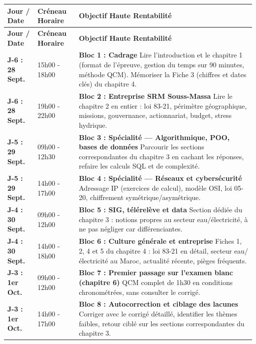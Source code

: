 {\small
\begin{longtable}{|p{3cm}|p{3.5cm}|p{8.5cm}|}
\hline
\rowcolor{gray!20} \textbf{Jour / Date} & \textbf{Créneau Horaire} & \textbf{Objectif Haute Rentabilité} \\ \hline
\endfirsthead
\hline
\rowcolor{gray!20} \textbf{Jour / Date} & \textbf{Créneau Horaire} & \textbf{Objectif Haute Rentabilité} \\ \hline
\endhead

\textbf{J-6 : 28 Sept.} & 15h00 - 18h00 & \textbf{Bloc 1 : Cadrage} \newline Lire l'introduction et le chapitre 1 (format de l'épreuve, gestion du temps sur 90 minutes, méthode QCM). Mémoriser la Fiche 3 (chiffres et dates clés) du chapitre 4. \\ \hline
\textbf{J-6 : 28 Sept.} & 19h00 - 22h00 & \textbf{Bloc 2 : Entreprise SRM Souss-Massa} \newline Lire le chapitre 2 en entier : loi 83-21, périmètre géographique, missions, gouvernance, actionnariat, budget, stress hydrique. \\ \hline

\textbf{J-5 : 29 Sept.} & 09h00 - 12h30 & \textbf{Bloc 3 : Spécialité --- Algorithmique, POO, bases de données} \newline Parcourir les sections correspondantes du chapitre 3 en cachant les réponses, refaire les calculs SQL et de complexité. \\ \hline
\textbf{J-5 : 29 Sept.} & 14h00 - 17h00 & \textbf{Bloc 4 : Spécialité --- Réseaux et cybersécurité} \newline Adressage IP (exercices de calcul), modèle OSI, loi 05-20, chiffrement symétrique/asymétrique. \\ \hline

\textbf{J-4 : 30 Sept.} & 09h00 - 12h00 & \textbf{Bloc 5 : SIG, télérelève et data} \newline Section dédiée du chapitre 3 : notions propres au secteur eau/électricité, à ne pas négliger car différenciantes. \\ \hline
\textbf{J-4 : 30 Sept.} & 14h00 - 18h00 & \textbf{Bloc 6 : Culture générale et entreprise} \newline Fiches 1, 2, 4 et 5 du chapitre 4 : loi 83-21 en détail, secteur eau/électricité au Maroc, actualité récente, pièges fréquents. \\ \hline

\textbf{J-3 : 1er Oct.} & 09h00 - 12h00 & \textbf{Bloc 7 : Premier passage sur l'examen blanc (chapitre 6)} \newline QCM complet de 1h30 en conditions chronométrées, sans consulter le corrigé. \\ \hline
\textbf{J-3 : 1er Oct.} & 14h00 - 17h00 & \textbf{Bloc 8 : Autocorrection et ciblage des lacunes} \newline Corriger avec le corrigé détaillé, identifier les thèmes faibles, retour ciblé sur les sections correspondantes du chapitre 3. \\ \hline


\end{longtable}}
